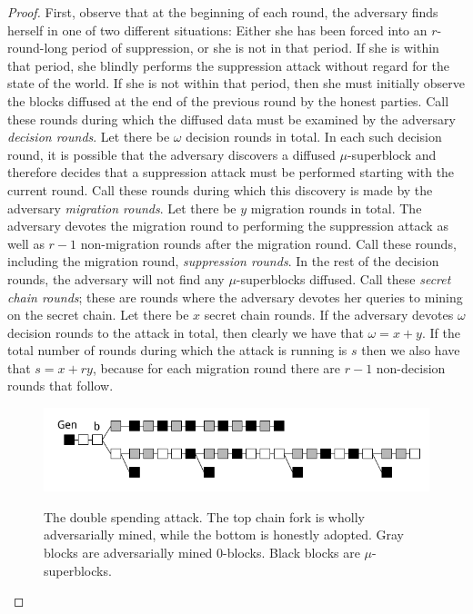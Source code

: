 \begin{proof}
First, observe that at the beginning of each round, the adversary finds herself
in one of two different situations: Either she has been forced into an
$r$-round-long period of suppression, or she is not in that period. If she is
within that period, she blindly performs the suppression attack without regard
for the state of the world. If she is not within that period, then she must
initially observe the blocks diffused at the end of the previous round by the
honest parties. Call these rounds during which the diffused data must be
examined by the adversary \emph{decision rounds}. Let there be $\omega$
decision rounds in total. In each such decision round, it is possible that the
adversary discovers a diffused $\mu$-superblock and therefore decides that a
suppression attack must be performed starting with the current round. Call these
rounds during which this discovery is made by the adversary \emph{migration
rounds}. Let there be $y$ migration rounds in total. The adversary devotes the
migration round to performing the suppression attack as well as $r - 1$
non-migration rounds after the migration round. Call these rounds, including the
migration round, \emph{suppression rounds}. In the rest of the decision
rounds, the adversary will not find any $\mu$-superblocks diffused. Call these
\emph{secret chain rounds}; these are rounds where the adversary devotes her
queries to mining on the secret chain. Let there be $x$ secret chain rounds. If
the adversary devotes $\omega$ decision rounds to the attack in total, then
clearly we have that $\omega = x + y$. If the total number of rounds during
which the attack is running is $s$ then we also have that $s = x + ry$, because
for each migration round there are $r - 1$ non-decision rounds that follow.

\begin{figure}[t]
    \caption{The double spending attack.
    The top chain fork is wholly adversarially mined, while the bottom is
    honestly adopted. Gray blocks are adversarially mined 0-blocks.
    Black blocks are $\mu$-superblocks.}
    \centering
    \includegraphics[width=0.9\columnwidth,keepaspectratio]{chapters/work/figures/double-spend-popow.png}
    \label{fig.double-spend}
\end{figure}


\end{proof}
